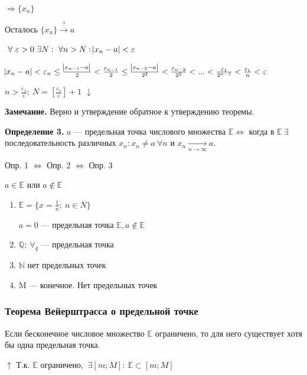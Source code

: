 \documentclass{article}
\begin{document}
  \(\Rightarrow \{x_n\}\)

  Осталось \(\{x_n\} \xrightarrow[]{\textrm{?}} a\)

  \(\ \forall\ \varepsilon > 0\ \exists N:\ \forall n > N: \abs{x_n - a} < \varepsilon\)

  \(\abs{x_n - a} < \varepsilon_n \leq \frac{\abs{x_{n-1}-a}}{2} < \frac{\varepsilon_{n-1}}{2} \leq \frac{\abs{x_{n-2}-a}}{2^2} < \frac{\varepsilon_{n-2}}{2^2} < ... < \frac{\varepsilon_{1}}{2^{n-1}} < \frac{\varepsilon_1}{n} < \varepsilon\)

  \(n > \frac{\varepsilon_1}{\varepsilon};\ N=[\frac{\varepsilon_1}{\varepsilon}] + 1\)
  \(\downarrow\)

  \textbf{Замечание.} Верно и утверждение обратное к утверждению теоремы.

  \textbf{Определение 3.} \(a\) --- предельная точка числового множества \(\mathbb{E} \Leftrightarrow\) когда в \(\mathbb{E}\ \exists\) последовательность различных \(x_n: x_n \neq a\ \forall n\) и \(x_n \xrightarrow[n \rightarrow \infty]{} a\).

  Опр. 1 \(\Leftrightarrow\) Опр. 2 \(\Leftrightarrow\) Опр. 3

  \(a \in \mathbb{E}\) или \(a \not\in \mathbb{E}\)

  \begin{enumerate}
      \item \(\mathbb{E} = \{x=\frac{1}{n};\ n \in N\}\)

      \(a = 0\) --- предельная точка \(\mathbb{E}, a \not \in \mathbb{E}\)

      \item \(\mathbb{Q};\ \forall_q\) --- предельная точка

      \item \(\mathbb{N}\) нет предельных точек

      \item M --- конечное. Нет предельных точек
  \end{enumerate}

  \subsubsection{Теорема Вейерштрасса о предельной точке}
  Если бесконечное числовое множество \(\mathbb{E}\) ограничено, то для него существует хотя бы одна предельная точка.

  \(\uparrow\) Т.к. \(\mathbb{E}\) ограничено, \(\ \exists [m; M]:\ \mathbb{E} \subset  [m; M]\)
\end{document}
